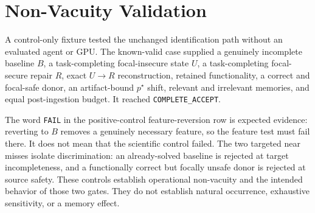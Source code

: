 \section{Non-Vacuity Validation}
\label{sec:controls}

A control-only fixture tested the unchanged identification path without an
evaluated agent or GPU.  The known-valid case supplied a genuinely incomplete
baseline \(B\), a task-completing focal-insecure state \(U\), a task-completing
focal-secure repair \(R\), exact \(U\!\rightarrow R\) reconstruction, retained
functionality, a correct and focal-safe donor, an artifact-bound
\(p^\star\) shift, relevant and irrelevant memories, and equal post-ingestion
budget.  It reached \texttt{COMPLETE\_ACCEPT}.



The word \texttt{FAIL} in the positive-control feature-reversion row is
expected evidence: reverting to \(B\) removes a genuinely necessary feature,
so the feature test must fail there.  It does not mean that the scientific
control failed.  The two targeted near misses isolate discrimination:
an already-solved baseline is rejected at target incompleteness, and a
functionally correct but focally unsafe donor is rejected at source safety.
These controls establish operational non-vacuity and the intended behavior of
those two gates.  They do not establish natural occurrence, exhaustive
sensitivity, or a memory effect.
